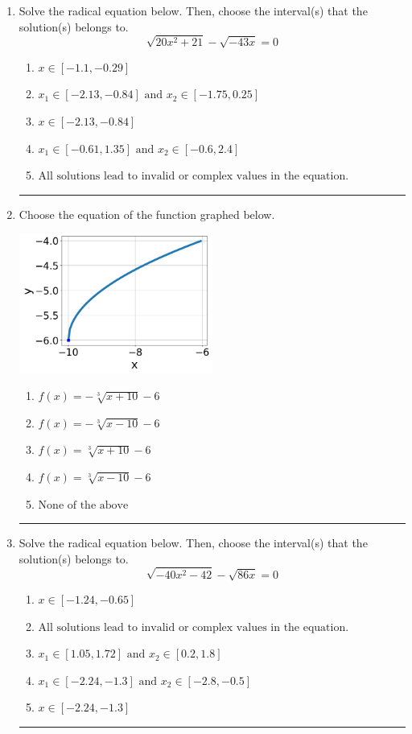 \documentclass[14pt]{extbook}
\newcommand{\litem}[1]{\item#1\hspace*{-1cm}\rule{\textwidth}{0.4pt}}
\begin{document}
\begin{enumerate}
\litem{
Solve the radical equation below. Then, choose the interval(s) that the solution(s) belongs to.\[ \sqrt{20 x^2 + 21} - \sqrt{-43 x} = 0 \]\begin{enumerate}[label=\Alph*.]
\item \( x \in [-1.1,-0.29] \)
\item \( x_1 \in [-2.13, -0.84] \text{ and } x_2 \in [-1.75,0.25] \)
\item \( x \in [-2.13,-0.84] \)
\item \( x_1 \in [-0.61, 1.35] \text{ and } x_2 \in [-0.6,2.4] \)
\item \( \text{All solutions lead to invalid or complex values in the equation.} \)

\end{enumerate} }
\litem{
Choose the equation of the function graphed below.
\begin{center}
    \includegraphics[width=0.5\textwidth]{../Figures/radicalGraphToEquationA.png}
\end{center}
\begin{enumerate}[label=\Alph*.]
\item \( f(x) = - \sqrt[3]{x + 10} - 6 \)
\item \( f(x) = - \sqrt[3]{x - 10} - 6 \)
\item \( f(x) = \sqrt[3]{x + 10} - 6 \)
\item \( f(x) = \sqrt[3]{x - 10} - 6 \)
\item \( \text{None of the above} \)

\end{enumerate} }
\litem{
Solve the radical equation below. Then, choose the interval(s) that the solution(s) belongs to.\[ \sqrt{-40 x^2 - 42} - \sqrt{86 x} = 0 \]\begin{enumerate}[label=\Alph*.]
\item \( x \in [-1.24,-0.65] \)
\item \( \text{All solutions lead to invalid or complex values in the equation.} \)
\item \( x_1 \in [1.05, 1.72] \text{ and } x_2 \in [0.2,1.8] \)
\item \( x_1 \in [-2.24, -1.3] \text{ and } x_2 \in [-2.8,-0.5] \)
\item \( x \in [-2.24,-1.3] \)


\end{enumerate}}
\end{enumerate}
\end{document}
